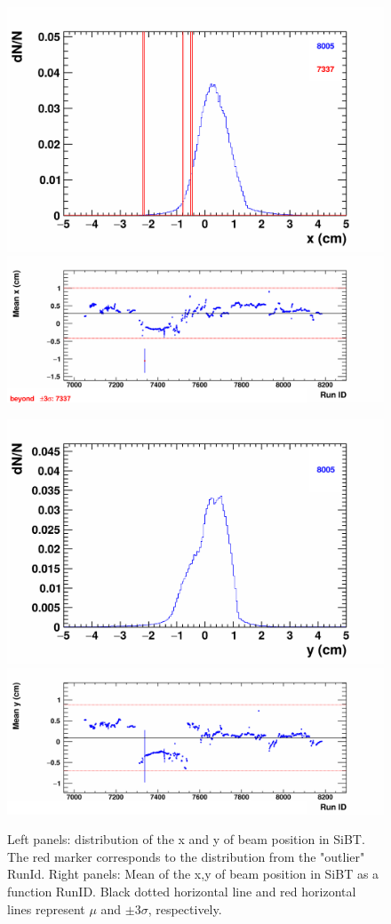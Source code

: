     \begin{figure}[H]
        \begin{center}
            \includegraphics[width=0.35\linewidth]{../pict/QA_RunByRun_24.12/H1/nVtxTr_h2_RunId_beam_x.png}
            \includegraphics[width=0.60\linewidth]{../pict/QA_RunByRun_24.12/nVtxTr_h2_RunId_beam_x.png}

            \includegraphics[width=0.35\linewidth]{../pict/QA_RunByRun_24.12/H1/nVtxTr_h2_RunId_beam_y.png}
            \includegraphics[width=0.60\linewidth]{../pict/QA_RunByRun_24.12/nVtxTr_h2_RunId_beam_y.png}

            \vspace{-3mm}
            \caption{Left panels: distribution of the x and y of beam position in SiBT. The red marker corresponds to the distribution from the "outlier" RunId. Right panels: Mean of the x,y of beam position in SiBT as a function RunID. Black dotted horizontal line and red horizontal lines represent $\mu$ and $\pm3\sigma$, respectively.}
            \label{fig:SiBT_beam}
        \end{center}
        \vspace{-5mm}
    \end{figure}


